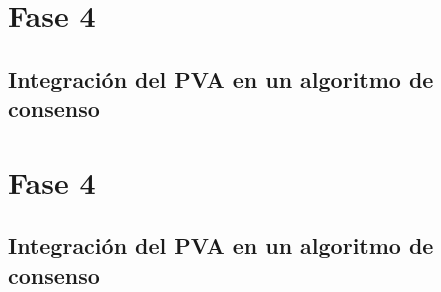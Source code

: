 \section{Fase 4}
\subsection{Integración del PVA en un algoritmo de consenso}
\section{Fase 4}
\subsection{Integración del PVA en un algoritmo de consenso}

